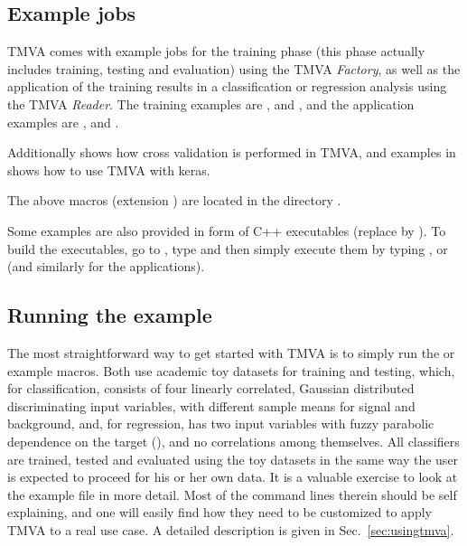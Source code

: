 \subsection{Example jobs}
\label{sec:examplejob}

TMVA comes with example jobs for the training phase (this phase actually 
includes training, testing and evaluation) using the TMVA {\em Factory}, 
as well as the application of the training results in a classification or regression analysis
using the TMVA {\em Reader}. The training examples are
,
 and
, and the application examples are 
,
 and
.

Additionally  shows how cross validation is performed in TMVA, and examples in \TmvaKerasTutorialDir shows how to use TMVA with keras.

The above macros (extension ) are located in the directory \TmvaTutorialDir.

Some examples are also provided in form of C++ executables
(replace  by ). To build the executables, go to
\TmvaTutorialDir, type  and then simply execute them by typing
,  or  (and similarly for the 
applications).


\subsection{Running the example}
\label{sec:qs:example}

The most straightforward way to get started with TMVA is to simply run the  
or  example macros. Both use academic toy datasets for training 
and testing, which, for classification, consists of four linearly correlated, Gaussian 
distributed discriminating input variables, with different sample means for signal and 
background, and, for regression, has two input variables with fuzzy parabolic dependence 
on the target (), and no correlations among themselves. All 
classifiers are trained, tested and evaluated using the toy datasets in the
same way the user is expected to proceed for his or her own data. It
is a valuable exercise to look at the example file in more detail. Most 
of the command lines therein should be self explaining, and one will easily 
find how they need to be customized to apply TMVA to a real use case.
A detailed description is given in Sec.~\ref{sec:usingtmva}.

